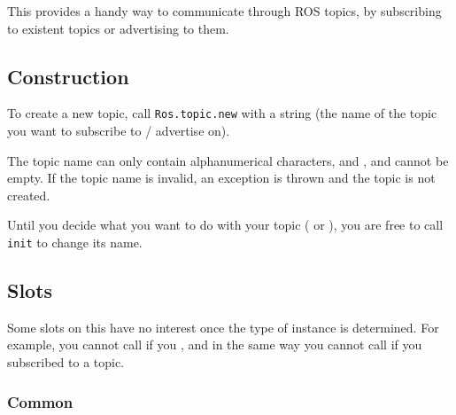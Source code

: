 
This \UObject provides a handy way to communicate through ROS topics, by
subscribing to existent topics or advertising to them.

\subsection{Construction}

To create a new topic, call \lstinline{Ros.topic.new} with a string (the
name of the topic you want to subscribe to / advertise on).

The topic name can only contain alphanumerical characters, \samp{/} and
\samp{\_}, and cannot be empty.  If the topic name is invalid, an exception
is thrown and the topic is not created.

Until you decide what you want to do with your topic ( or
), you are free to call \lstinline{init} to change its
name.


\subsection{Slots}

Some slots on this \UObject have no interest once the type of instance is
determined. For example, you cannot call  if you
, and in the same way you cannot call 
if you subscribed to a topic.

\subsubsection{Common}

